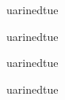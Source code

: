 \documentclass[Songbook.tex]{subfiles}
\begin{document}
	\pagebreak
	
	uarinedtue
	
	uarinedtue
	
	uarinedtue
	
	uarinedtue
\end{document}
